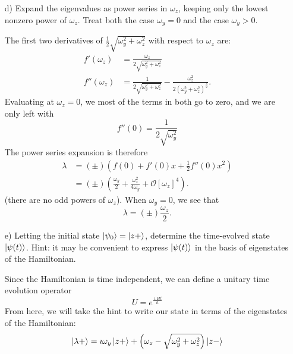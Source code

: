 \documentclass[a4paper,twoside]{article}
\begin{document}
\begin{itemize}
    \item[d)] Expand the eigenvalues as power series in $\omega_z$, keeping only the lowest nonzero power of $\omega_z$. Treat both the case $\omega_y = 0$ and the case $\omega_y > 0$.
\begin{tcolorbox}[breakable]
    The first two derivatives of $\frac{1}{2}\sqrt{\omega_y^2+\omega_z^2}$ with respect to $\omega_z$ are:
    \begin{align*}
        f'(\omega_z) &= \frac{\omega_z}{2\sqrt{\omega_y^2+\omega_z^2} }\\
        f''(\omega_z) &= \frac{1}{2\sqrt{\omega_y^2+\omega_z^2} }- \frac{\omega_z^2}{2\left(\omega_y^2+\omega_z^2 \right)^{\frac{3}{2}} }
    .\end{align*}
    Evaluating at $\omega_z = 0$, we most of the terms in both go to zero, and we are only left with
    \begin{equation}
        f''(0)=\frac{1}{2\sqrt{\omega_y^2} }
    \end{equation}
    The power series expansion is therefore
    \begin{align*}
        \lambda &= (\pm)\left( f(0) + f'(0)x + \frac{1}{2}f''(0)x^2 \right)\\
                &= (\pm)\left( \frac{\omega_y}{2} + \frac{\omega_z^2}{4\omega_y} + \mathcal{O}[\omega_z]^4  \right) 
    .\end{align*}
    (there are no odd powers of $\omega_z$). When $\omega_y = 0$, we see that
\begin{equation}
    \lambda = (\pm) \frac{\omega_z}{2}.
\end{equation}
\end{tcolorbox}
    \item[e)] Letting the initial state $\ket{\psi_0} = \ket{z+}$, determine the time-evolved state $\ket{\psi(t)}$. Hint: it may be convenient to express $\ket{\psi(t)}$ in the basis of eigenstates of the Hamiltonian.
        \begin{tcolorbox}[breakable]
            Since the Hamiltonian is time independent, we can define a unitary time evolution operator
            \begin{equation}
                U = e^{\frac{\imath Ht}{\hbar}} 
            \end{equation}
            From here, we will take the hint to write our state in terms of the eigenstates of the Hamiltonian:
\begin{equation}
    \ket{\lambda+} = \imath\omega_y\ket{z+} + \left(\omega_z-\sqrt{\omega_y^2+\omega_z^2}\right)\ket{z-}

\end{equation}
\end{tcolorbox}
\end{itemize}
\end{document}
